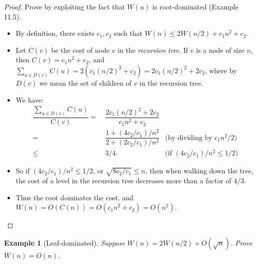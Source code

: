 \documentclass[11pt,a4paper,oneside,microtype,nokorean]{oblivoir}
\newtheorem{example}{Example}
\begin{document}
\begin{proof}
  Prove by exploiting the fact that $W(n)$ is root-dominated (Example 11.5).

  \begin{itemize}
  \item By definition, there exists $c_1,c_2$ such that $W(n) \le 2W(n/2) + c_1 n^2 + c_2.$
  \item Let $C(v)$ be the cost of node $v$ in the \emph{recursion tree}.  If $v$ is a node of size
    $n$, then $C(v) = c_1 n^2 + c_2$, and
    $\sum_{u \in D(v)} C(u) = 2(c_1 (n/2)^2 + c_2) = 2 c_1 (n/2)^2 + 2 c_2$, where by $D(v)$ we mean
    the set of children of $v$ in the recursion tree.
  \item We have:
    \begin{align*}
      \dfrac{\sum_{u \in D(v)} C(u)}{C(v)}
      = &~ \dfrac{2 c_1 (n/2)^2 + 2 c_2}{c_1 n^2 + c_2} \\
      = &~ \dfrac{1 + (4 c_2 / c_1) / n^2}{2 + (2 c_2 / c_1) / n^2} & \mbox{(by dividing by $c_1 n^2 / 2$)} \\
      \le &~ 3/4. & \mbox{(if $(4 c_2 / c_1) / n^2 \le 1/2$)}
    \end{align*}
  \item So if $(4 c_2 / c_1) / n^2 \le 1/2$, or $\sqrt{8 c_2 / c_1} \le n$, then when walking down
    the tree, the cost of a level in the recursion tree decreases more than a factor of $4/3$.
  \item Thus the root dominates the cost, and $W(n) = O(C(n)) = O(c_1 n^2 + c_2) = O(n^2)$.
  \end{itemize}
\end{proof}


\begin{example}[Leaf-dominated] Suppose $W(n) = 2W(n/2) + O(\sqrt{n})$.  Prove $W(n) = O(n)$.
\end{example}
\end{document}

